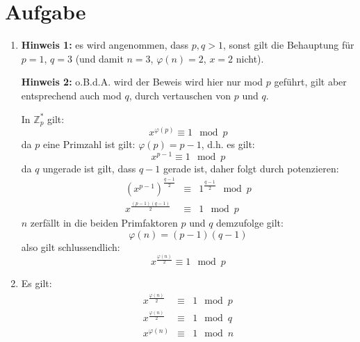 \documentclass[DIN, pagenumber=false, fontsize=11pt, parskip=half]{scrartcl}
\begin{document}
    \section{Aufgabe}
    \begin{enumerate}[label=(\roman*)]
        \item 
            \textbf{Hinweis 1:} es wird angenommen, dass $p, q > 1$, 
            sonst gilt die Behauptung für $p=1$, $q=3$ 
            (und damit $n=3$, $\varphi(n)=2$, $x=2$ nicht).

        
            \textbf{Hinweis 2:} o.B.d.A. wird der Beweis wird hier nur mod $p$ geführt,
            gilt aber entsprechend auch mod $q$, durch vertauschen von $p$ und $q$.

            In $\mathbb{Z}^*_p$ gilt:
            \begin{equation}
                x^{\varphi(p)} \equiv 1 \mod p
            \end{equation}
            da $p$ eine Primzahl ist gilt: $\varphi(p) = p-1$,
            d.h. es gilt: 
            \begin{equation}
                x^{p-1} \equiv 1 \mod p
            \end{equation}
            da $q$ ungerade ist gilt, dass $q-1$ gerade ist, daher folgt
            durch potenzieren:
            \begin{eqnarray}
                {\left(x^{p-1}\right)}^{\frac{q-1}{2}} &\equiv& 1^{\frac{q-1}{2}} \mod p \\
                x^{\frac{(p-1)(q-1)}{2}} &\equiv& 1 \mod p
            \end{eqnarray}
            $n$ zerfällt in die beiden Primfaktoren $p$ und $q$ demzufolge gilt:
            \begin{equation}
                \varphi(n) = (p-1)(q-1)
            \end{equation}
            also gilt schlussendlich:
            \begin{equation}
                x^{\frac{\varphi(n)}{2}} \equiv 1 \mod p
            \end{equation}
        \item 
            Es gilt:
            \begin{eqnarray}
                x^{\frac{\varphi(n)}{2}} &\equiv& 1 \mod p \\
                x^{\frac{\varphi(n)}{2}} &\equiv& 1 \mod q \\
                x^{\varphi(n)} &\equiv& 1 \mod n
            \end{eqnarray}

\end{enumerate}
\end{document}
